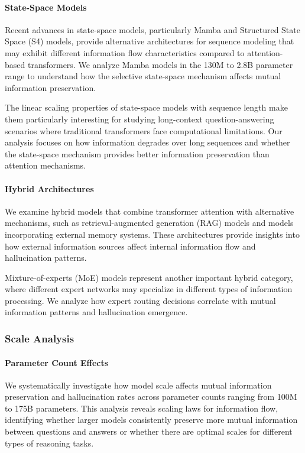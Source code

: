 \paragraph{State-Space Models}
Recent advances in state-space models, particularly Mamba and Structured State Space (S4) models, provide alternative architectures for sequence modeling that may exhibit different information flow characteristics compared to attention-based transformers. We analyze Mamba models in the 130M to 2.8B parameter range to understand how the selective state-space mechanism affects mutual information preservation.

The linear scaling properties of state-space models with sequence length make them particularly interesting for studying long-context question-answering scenarios where traditional transformers face computational limitations. Our analysis focuses on how information degrades over long sequences and whether the state-space mechanism provides better information preservation than attention mechanisms.

\paragraph{Hybrid Architectures}
We examine hybrid models that combine transformer attention with alternative mechanisms, such as retrieval-augmented generation (RAG) models and models incorporating external memory systems. These architectures provide insights into how external information sources affect internal information flow and hallucination patterns.

Mixture-of-experts (MoE) models represent another important hybrid category, where different expert networks may specialize in different types of information processing. We analyze how expert routing decisions correlate with mutual information patterns and hallucination emergence.

\subsubsection{Scale Analysis}

\paragraph{Parameter Count Effects}
We systematically investigate how model scale affects mutual information preservation and hallucination rates across parameter counts ranging from 100M to 175B parameters. This analysis reveals scaling laws for information flow, identifying whether larger models consistently preserve more mutual information between questions and answers or whether there are optimal scales for different types of reasoning tasks.

